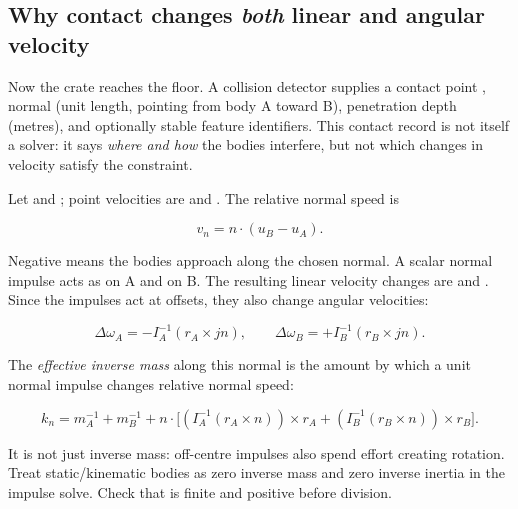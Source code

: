 \subsection{\texorpdfstring{Why contact changes \emph{both} linear and angular velocity}{Why contact changes both linear and angular velocity}}\label{06-engine-ii-ch033-why-contact-changes-both-linear-and-angular-velocity}

\hypertarget{06-engine-ii-ch033-why-contact-changes-both-linear-and-angular-velocity}{}

Now the crate reaches the floor. A collision detector supplies a contact point , normal  (unit length, pointing from body A toward B), penetration depth  (metres), and optionally stable feature identifiers. This contact record is not itself a solver: it says \emph{where and how} the bodies interfere, but not which changes in velocity satisfy the constraint.

Let  and ; point velocities are  and . The relative normal speed is

\[
v_n=n\cdot(u_B-u_A).
\]

Negative  means the bodies approach along the chosen normal. A scalar normal impulse  acts as  on A and  on B. The resulting linear velocity changes are  and . Since the impulses act at offsets, they also change angular velocities:

\[
\Delta\omega_A=-I_A^{-1}(r_A\times jn),\qquad
\Delta\omega_B=+I_B^{-1}(r_B\times jn).
\]

The \emph{effective inverse mass} along this normal is the amount by which a unit normal impulse changes relative normal speed:

\[
k_n=m_A^{-1}+m_B^{-1}
+n\cdot\Big[
(I_A^{-1}(r_A\times n))\times r_A
+(I_B^{-1}(r_B\times n))\times r_B
\Big].
\]

It is not just inverse mass: off-centre impulses also spend effort creating rotation. Treat static/kinematic bodies as zero inverse mass and zero inverse inertia in the impulse solve. Check that  is finite and positive before division.


